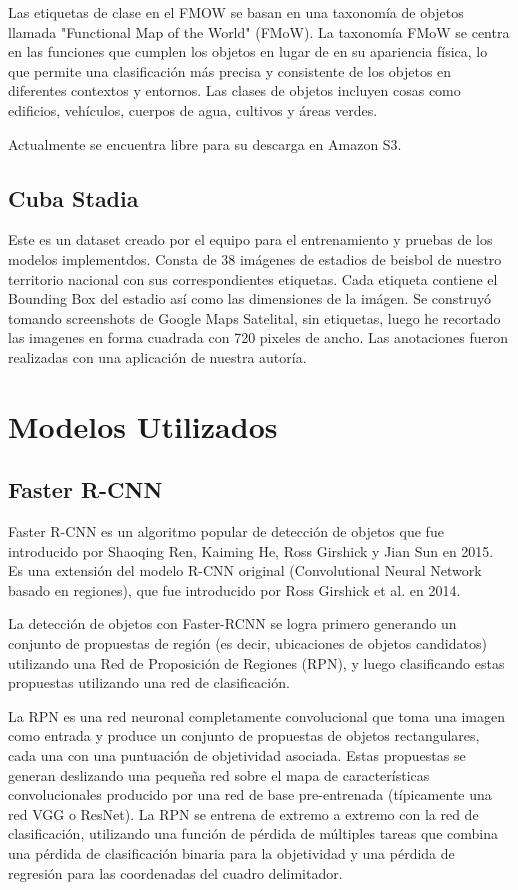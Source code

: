 \documentclass[article]{llncs}
\begin{document}
Las etiquetas de clase en el FMOW se basan en una taxonomía de objetos llamada "Functional Map of the World" (FMoW). La 
taxonomía FMoW se centra en las funciones que cumplen los objetos en lugar de en su apariencia física, lo que permite 
una clasificación más precisa y consistente de los objetos en diferentes contextos y entornos. Las clases de objetos 
incluyen cosas como edificios, vehículos, cuerpos de agua, cultivos y áreas verdes.

Actualmente se encuentra libre para su descarga en Amazon S3.

\subsection{Cuba Stadia}

Este es un dataset creado por el equipo para el entrenamiento y pruebas de los modelos implementdos. Consta de 38 
im\'agenes de estadios de beisbol de nuestro territorio nacional con sus correspondientes etiquetas. Cada etiqueta 
contiene el Bounding Box del estadio as\'i como las dimensiones de la im\'agen. Se construy\'o tomando screenshots 
de Google Maps Satelital, sin etiquetas, luego he recortado las imagenes en forma cuadrada con 720 pixeles de ancho. 
Las anotaciones fueron realizadas con una aplicaci\'on de nuestra autor\'ia.

\section{Modelos Utilizados}

\subsection{Faster R-CNN}
Faster R-CNN es un algoritmo popular de detección de objetos que fue introducido por Shaoqing Ren, 
Kaiming He, Ross Girshick y Jian Sun en 2015. Es una extensión del modelo R-CNN original (Convolutional Neural 
Network basado en regiones), que fue introducido por Ross Girshick et al. en 2014.

La detección de objetos con Faster-RCNN se logra primero generando un conjunto de propuestas de región 
(es decir, ubicaciones de objetos candidatos) utilizando una Red de Proposición de Regiones (RPN), y luego 
clasificando estas propuestas utilizando una red de clasificación.

La RPN es una red neuronal completamente convolucional que toma una imagen como entrada y produce un conjunto de 
propuestas de objetos rectangulares, cada una con una puntuación de objetividad asociada. Estas propuestas se generan 
deslizando una pequeña red sobre el mapa de características convolucionales producido por una red de base pre-entrenada 
(típicamente una red VGG o ResNet). La RPN se entrena de extremo a extremo con la red de clasificación, utilizando una 
función de pérdida de múltiples tareas que combina una pérdida de clasificación binaria para la objetividad y una 
pérdida de regresión para las coordenadas del cuadro delimitador.
\end{document}
